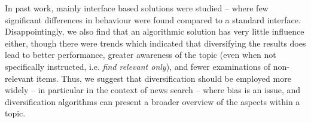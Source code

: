 In past work, mainly interface based solutions were studied -- where few significant differences in behaviour were found compared to a standard interface. Disappointingly, we also find that an algorithmic solution has very little influence either, though there were trends which indicated that diversifying the results does lead to better performance, greater awareness of the topic (even when not specifically instructed, i.e. \textit{find relevant only}), and fewer examinations of non-relevant items. Thus, we suggest that diversification should be employed more widely -- in particular in the context of news search -- where bias is an issue, and diversification algorithms can present a broader overview of the aspects within a topic. 



